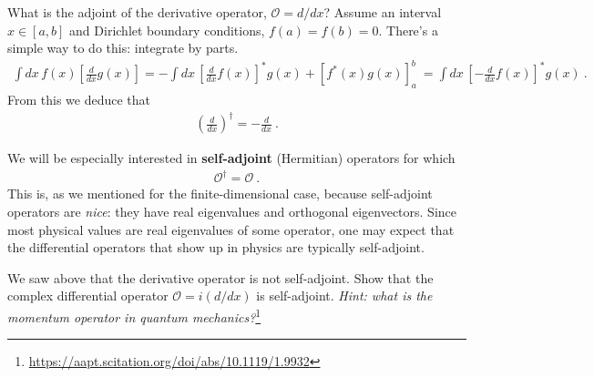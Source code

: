 \documentclass[12pt, oneside]{report}    %
\begin{document}
\begin{example}
What is the adjoint of the derivative operator, $\mathcal O = d/dx$? Assume an interval $x\in[a,b]$ and Dirichlet boundary conditions, $f(a)=f(b)=0$. There's a simple way to do this: integrate by parts.
\begin{align}
  \int dx \,  f(x) \left[\frac{d}{dx} g(x)\right]
  =
  - \int dx \, \left[\frac{d}{dx}f(x)\right]^* g(x)
  +
  \left[f^*(x)g(x)\right]^b_a \ 
  =
  \int dx \, \left[-\frac{d}{dx}f(x)\right]^* g(x)
  \ . 
\end{align}
From this we deduce that
\begin{align}
  \left(\frac{d}{dx}\right)^\dag = -\frac{d}{dx} \ .
\end{align}
\end{example}



We will be especially interested in \textbf{self-adjoint} (Hermitian) operators for which
\begin{align}
  \mathcal O^\dag = \mathcal O \ .
\end{align}
This is, as we mentioned for the finite-dimensional case, because self-adjoint operators are \emph{nice}: they have real eigenvalues and orthogonal eigenvectors. Since most physical values are real eigenvalues of some operator, one may expect that the differential operators that show up in physics are typically self-adjoint.
\begin{exercise}
We saw above that the derivative operator is not self-adjoint. Show that the complex differential operator $\mathcal O=i(d/dx)$ is self-adjoint. \emph{Hint: what is the momentum operator in quantum mechanics?}\footnote{\url{https://aapt.scitation.org/doi/abs/10.1119/1.9932}} 
\end{exercise}
\end{document}
